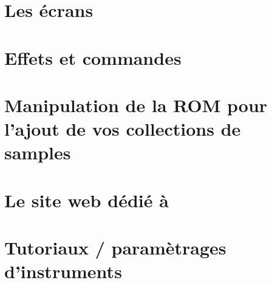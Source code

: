 \documentclass[12pt,a4paper]{article}
\begin{document}
  \newpage
  \section{Les écrans}
  

  \newpage
  \section{Effets et commandes}
  

  \newpage
  \section{Manipulation de la ROM pour l'ajout de vos collections de samples}
  

  \newpage
  \section{Le site web dédié à \FAT}
  

  \newpage
  \section{Tutoriaux / paramètrages d'instruments}
  
\end{document}
